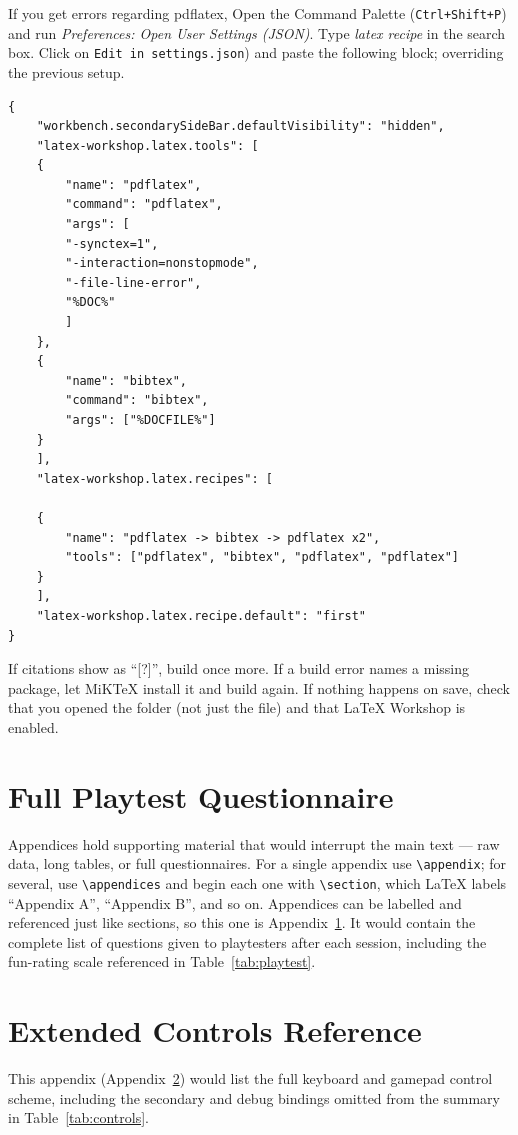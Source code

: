 \documentclass[a4paper,twoside,twocolumn]{IEEEtran}
\begin{document}
If you get errors regarding pdflatex, Open the Command Palette 
(\texttt{Ctrl+Shift+P}) and run \emph{Preferences: Open User Settings (JSON)}.
Type \emph{latex recipe} in the search box. Click on \texttt{Edit in settings.json})
and paste the following block; overriding the previous setup.

\begin{footnotesize}
\begin{verbatim}
{
    "workbench.secondarySideBar.defaultVisibility": "hidden",
    "latex-workshop.latex.tools": [
    {
        "name": "pdflatex",
        "command": "pdflatex",
        "args": [
        "-synctex=1",
        "-interaction=nonstopmode",
        "-file-line-error",
        "%DOC%"
        ]
    },
    {
        "name": "bibtex",
        "command": "bibtex",
        "args": ["%DOCFILE%"]
    }
    ],
    "latex-workshop.latex.recipes": [
        
    {
        "name": "pdflatex -> bibtex -> pdflatex x2",
        "tools": ["pdflatex", "bibtex", "pdflatex", "pdflatex"]
    }
    ],
    "latex-workshop.latex.recipe.default": "first"
}
\end{verbatim}
\end{footnotesize}

If citations show as ``[?]'', build once more. If a build error names a missing
package, let MiKTeX install it and build again. If nothing happens on save,
check that you opened the folder (not just the file) and that LaTeX Workshop is
enabled.

\section{Full Playtest Questionnaire}
\label{app:questionnaire}
Appendices hold supporting material that would interrupt the main text --- raw
data, long tables, or full questionnaires. For a single appendix use
\verb|\appendix|; for several, use \verb|\appendices| and begin each one with
\verb|\section|, which LaTeX labels ``Appendix A'', ``Appendix B'', and so on.
Appendices can be labelled and referenced just like sections, so this one is
Appendix~\ref{app:questionnaire}. It would contain the complete list of questions
given to playtesters after each session, including the fun-rating scale
referenced in Table~\ref{tab:playtest}.

\section{Extended Controls Reference}
\label{app:controls}
This appendix (Appendix~\ref{app:controls}) would list the full keyboard and
gamepad control scheme, including the secondary and debug bindings omitted from
the summary in Table~\ref{tab:controls}.
\end{document}
